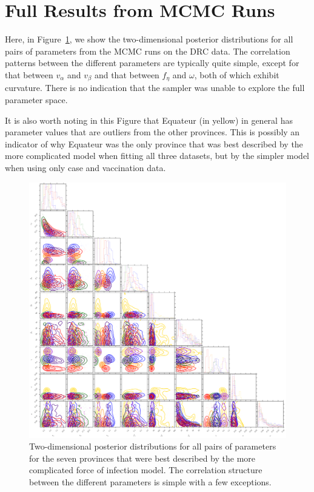 \documentclass[nofootinbib,aps,pre,twocolumn,superscriptaddress,showkeys,showpacs]{revtex4-1}
\begin{document}

\appendix*
    \section{Full Results from MCMC Runs}
Here, in Figure~\ref{fig:cornerplot}, we show the two-dimensional posterior distributions for all pairs of parameters from the MCMC runs on the DRC data. The correlation patterns between the different parameters are typically quite simple, except for that between $v_\alpha$ and $v_\beta$ and that between $f_\eta$ and $\omega$, both of which exhibit curvature. There is no indication that the sampler was unable to explore the full parameter space.

It is also worth noting in this Figure that Equateur (in yellow) in general has parameter values that are outliers from the other provinces. This is possibly an indicator of why Equateur was the only province that was best described by the more complicated model when fitting all three datasets, but by the simpler model when using only case and vaccination data.

\begin{figure}
\includegraphics[width=\textwidth,angle=0]{figures/cornerplot.png}
\caption{\label{fig:cornerplot}  Two-dimensional posterior distributions for all pairs of parameters for the seven provinces that were best described by the more complicated force of infection model. The correlation structure between the different parameters is simple with a few exceptions.}
\end{figure}




\end{document}
